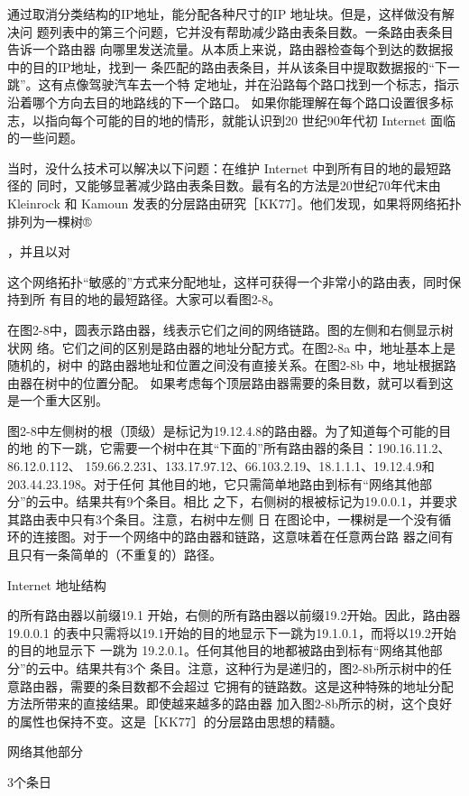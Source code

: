 通过取消分类结构的IP地址，能分配各种尺寸的IP 地址块。但是，这样做没有解决问
题列表中的第三个问题，它并没有帮助减少路由表条目数。一条路由表条目告诉一个路由器
向哪里发送流量。从本质上来说，路由器检查每个到达的数据报中的目的IP地址，找到一
条匹配的路由表条目，并从该条目中提取数据报的“下一跳”。这有点像驾驶汽车去一个特
定地址，并在沿路每个路口找到一个标志，指示沿着哪个方向去目的地路线的下一个路口。
如果你能理解在每个路口设置很多标志，以指向每个可能的目的地的情形，就能认识到20
世纪90年代初 Internet 面临的一些问题。

当时，没什么技术可以解决以下问题：在维护 Internet 中到所有目的地的最短路径的
同时，又能够显著减少路由表条目数。最有名的方法是20世纪70年代末由 Kleinrock 和
Kamoun 发表的分层路由研究［KK77］。他们发现，如果将网络拓扑排列为一棵树®

，并且以对

这个网络拓扑“敏感的”方式来分配地址，这样可获得一个非常小的路由表，同时保持到所
有目的地的最短路径。大家可以看图2-8。

在图2-8中，圆表示路由器，线表示它们之间的网络链路。图的左侧和右侧显示树状网
络。它们之间的区别是路由器的地址分配方式。在图2-8a 中，地址基本上是随机的，树中
的路由器地址和位置之间没有直接关系。在图2-8b 中，地址根据路由器在树中的位置分配。
如果考虑每个顶层路由器需要的条目数，就可以看到这是一个重大区别。

图2-8中左侧树的根（顶级）是标记为19.12.4.8的路由器。为了知道每个可能的目的地
的下一跳，它需要一个树中在其“下面的”所有路由器的条目：190.16.11.2、86.12.0.112、
159.66.2.231、133.17.97.12、66.103.2.19、18.1.1.1、19.12.4.9和 203.44.23.198。对于任何
其他目的地，它只需简单地路由到标有“网络其他部分”的云中。结果共有9个条目。相比
之下，右侧树的根被标记为19.0.0.1，并要求其路由表中只有3个条目。注意，右树中左侧
日 在图论中，一棵树是一个没有循环的连接图。对于一个网络中的路由器和链路，这意味着在任意两台路
器之间有且只有一条简单的（不重复的）路径。

Internet 地址结构

的所有路由器以前缀19.1 开始，右侧的所有路由器以前缀19.2开始。因此，路由器 19.0.0.1
的表中只需将以19.1开始的目的地显示下一跳为19.1.0.1，而将以19.2开始的目的地显示下
一跳为 19.2.0.1。任何其他目的地都被路由到标有“网络其他部分”的云中。结果共有3个
条目。注意，这种行为是递归的，图2-8b所示树中的任意路由器，需要的条目数都不会超过
它拥有的链路数。这是这种特殊的地址分配方法所带来的直接结果。即使越来越多的路由器
加入图2-8b所示的树，这个良好的属性也保持不变。这是［KK77］的分层路由思想的精髓。

网络其他部分

3个条日

